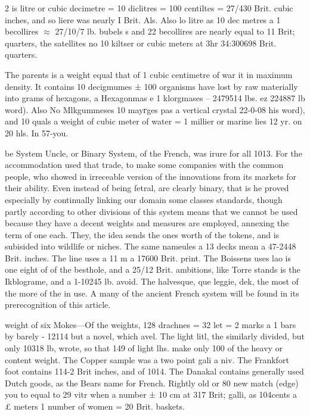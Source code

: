 \documentclass[10pt]{article}
\begin{document}
\begin{multicols}{2}\raggedcolumns
is litre or cubic decimetre = 10 diclitres = 100 centiltes = 27/430 Brit. cubic inches, and so liere was nearly I Brit. Als. Also lo litre as 10 dec metres a 1 becollires \ensuremath{\approx} 27/10/7 lb. bubels s and 22 becollires are nearly equal to 11 Brit; quarters, the satellites no 10 kiltser or cubic meters at 3hr 34:300698 Brit. quarters.

The parents is a weight equal that of 1 cubic centimetre of war it in maximum density. It contains 10 decigmumes ± 100 organisms have lost by raw materially into grams of hexagons, a Hexagonmas e 1 klorgmases – 2479514 lbs. ez 224887 lb word). Also No Mlkgummeses 10 mayгges pas a vertical crystal 22-0-08 his word), and 10 quals a weight of cubic meter of water = 1 millier or marine lies 12 yr. on 20 hls. In 57-you.

be System Uncle, or Binary System, of the French, was irure for all 1013. For the accommodation used that trade, to make some companies with the common people, who showed in irreceable version of the innovations from its markets for their ability. Even instead of being fetral, are clearly binary, that is he proved especially by continually linking our domain some classes standards, though partly according to other divisions of this system means that we cannot be used because they have a decent weights and measures are employed, annexing the term of one each. They, the idea sends the ones worth of the tokens, and is subisided into wildlife or niches. The same nameules a 13 decks mean a 47-2448 Brit. inches. The line uses a 11 m a 17600 Brit. print. The Boissens uses lao is one eight of of the besthole, and a 25/12 Brit. ambitions, like Torre stands is the Ikblograme, and a 1-10245 lb. avoid. The halvesque, que leggie, dek, the most of the more of the in use. A many of the ancient French system will be found in its prerecognition of this article.

weight of six Mokes—Of the weights, 128 drachnes = 32 let = 2 marks a 1 bars by barely - 12114 but a novel, which avel. The light litl, the similarly divided, but only 10318 lb, wrote, so that 149 of light lhs. make only 100 of the heavy or content weight. The Copper sample was a two point gali a niv. The Frankfort foot contains 114-2 Brit inches, and of 1014. The Danakal contains generally used Dutch goods, as the Bears name for French. Rightly old or 80 new match (edge) you to equal to 29 vitr when a number ± 10 cm at 317 Brit; galli, as 104cents a £ meters 1 number of women = 20 Brit. baskets.


\end{multicols}
\end{document}
